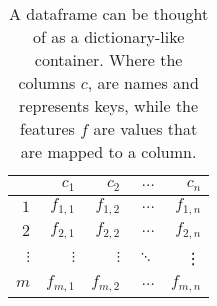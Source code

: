 \begin{table}[ht]
    \centering
    \begin{tabular}{| r | r r r r |}
        \hline
                    & $c_1$     & $c_2$     & $\dots$   & $c_n$     \\
        \hline
        $1$         & $f_{1,1}$ & $f_{1,2}$ & $\dots$   & $f_{1,n}$ \\
        $2$         & $f_{2,1}$ & $f_{2,2}$ & $\dots$   & $f_{2,n}$ \\
        $\vdots$    & $\vdots$  & $\vdots$  & $\ddots$  & \vdots    \\
        $m$         & $f_{m,1}$ & $f_{m,2}$ & $\dots$   & $f_{m,n}$ \\
        \hline
    \end{tabular}
    \caption[Definition - Dataframe ]{A dataframe can be thought of as a dictionary-like container. Where the columns $c$, are names and represents keys, while the features $f$ are values that are mapped to a column.}
    \label{tab:dataframe}
\end{table}